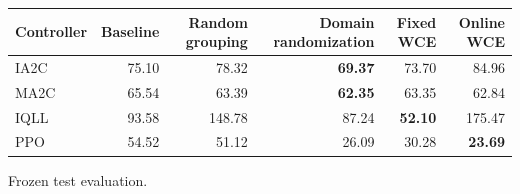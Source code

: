 \begin{tabular}{lrrrrr}
\hline
Controller & Baseline & Random grouping & Domain randomization & Fixed WCE & Online WCE \\
\hline
IA2C & 75.10 & 78.32 & \textbf{69.37} & 73.70 & 84.96 \\
MA2C & 65.54 & 63.39 & \textbf{62.35} & 63.35 & 62.84 \\
IQLL & 93.58 & 148.78 & 87.24 & \textbf{52.10} & 175.47 \\
PPO & 54.52 & 51.12 & 26.09 & 30.28 & \textbf{23.69} \\
\hline
\end{tabular}
Frozen test evaluation.
